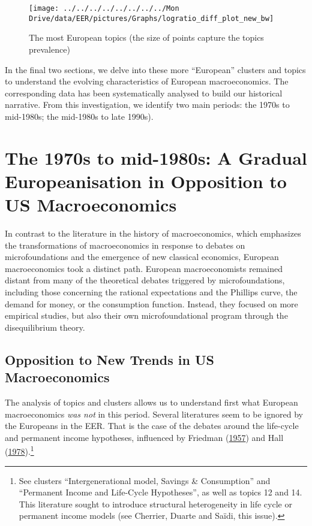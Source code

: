 \documentclass[
  12pt,
  onecolumn]{article}
\begin{document}
\begin{figure}[H]

{\centering \texttt{[image: ../../../../../../../../Mon Drive/data/EER/pictures/Graphs/logratio\_diff\_plot\_new\_bw]} 

}

\caption{The most European topics (the size of points capture the topics prevalence)}\label{fig:plot-topic-diff}
\end{figure}

\bigskip

In the final two sections, we delve into these more ``European''
clusters and topics to understand the evolving characteristics of
European macroeconomics. The corresponding data has been systematically
analysed to build our historical narrative. From this investigation, we
identify two main periods: the 1970s to mid-1980s; the mid-1980s to late
1990s).

\hypertarget{the-1970s-to-mid-1980s-a-gradual-europeanisation-in-opposition-to-us-macroeconomics}{%
\section{The 1970s to mid-1980s: A Gradual Europeanisation in Opposition
to US
Macroeconomics}\label{the-1970s-to-mid-1980s-a-gradual-europeanisation-in-opposition-to-us-macroeconomics}}

In contrast to the literature in the history of macroeconomics, which
emphasizes the transformations of macroeconomics in response to debates
on microfoundations and the emergence of new classical economics,
European macroeconomics took a distinct path. European macroeconomists
remained distant from many of the theoretical debates triggered by
microfoundations, including those concerning the rational expectations
and the Phillips curve, the demand for money, or the consumption
function. Instead, they focused on more empirical studies, but also
their own microfoundational program through the disequilibrium theory.

\hypertarget{opposition-trends}{%
\subsection{Opposition to New Trends in US
Macroeconomics}\label{opposition-trends}}

The analysis of topics and clusters allows us to understand first what
European macroeconomics \emph{was not} in this period. Several
literatures seem to be ignored by the Europeans in the EER. That is the
case of the debates around the life-cycle and permanent income
hypotheses, influenced by Friedman
(\protect\hyperlink{ref-friedman1957}{1957}) and Hall
(\protect\hyperlink{ref-hall1978b}{1978}).\footnote{See clusters
  ``Intergenerational model, Savings \& Consumption'' and ``Permanent
  Income and Life-Cycle Hypotheses'', as well as topics 12 and 14. This
  literature sought to introduce structural heterogeneity in life cycle
  or permanent income models (see Cherrier, Duarte and Saïdi, this
  issue).}
\end{document}
